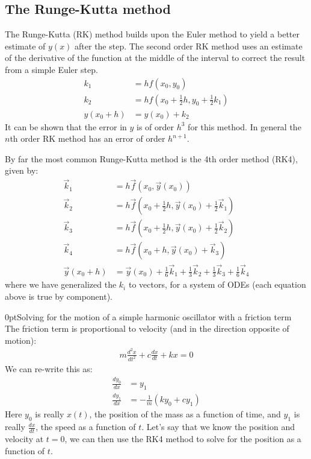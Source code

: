 \subsection{The Runge-Kutta method}

The Runge-Kutta (RK) method builds upon the Euler method to yield a better estimate of $y(x)$ after the step. The second order RK method uses an estimate of the derivative of the function at the middle of the interval to correct the result from a simple Euler step.
\begin{align}
 k_1 &= hf(x_0,y_0) \nonumber\\
 k_2 &= hf(x_0+\frac{1}{2}h,y_0+\frac{1}{2}k_1) \nonumber\\
 y(x_0+h) &= y(x_0)+k_2 
\end{align}
It can be shown that the error in $y$ is of order $h^3$ for this method. In general the $n$th order RK method has an error of order $h^{n+1}$.

By far the most common Runge-Kutta method is the 4th order method (RK4), given by:
\begin{align}
 \vec{k}_1 &= h\vec{f}(x_0,\vec{y}(x_0)) \nonumber\\
 \vec{k}_2 &= h\vec{f}(x_0+\frac{1}{2}h,\vec{y}(x_0)+\frac{1}{2}\vec{k}_1)\nonumber\\ 
 \vec{k}_3 &= h\vec{f}(x_0+\frac{1}{2}h,\vec{y}(x_0)+\frac{1}{2}\vec{k}_2) \nonumber\\
 \vec{k}_4 &= h\vec{f}(x_0+h,\vec{y}(x_0)+\vec{k}_3) \nonumber\\
 \vec{y}(x_0+h) &= \vec{y}(x_0)+\frac{1}{6}\vec{k}_1 +\frac{1}{3}\vec{k}_2 +\frac{1}{3}\vec{k}_3 +\frac{1}{6} \vec{k}_4 
\end{align}
where we have generalized the $k_i$ to vectors, for a system of ODEs (each equation above is true by component).
\begin{example}{0pt}{Solving for the motion of a simple harmonic oscillator with a friction term}{}
 The friction term is proportional to velocity (and in the direction opposite of motion):
\begin{align*}
 m\frac{d^2x}{dt^2}+c\frac{dx}{dt}+kx = 0
\end{align*}
We can re-write this as:
\begin{align*}
 \frac{dy_0}{dx} &= y_1 \nonumber\\
 \frac{dy_1}{dx} &= -\frac{1}{m}(ky_0+cy_1) 
\end{align*}
Here $y_0$ is really $x(t)$, the position of the mass as a function of time, and $y_1$ is really $\frac{dx}{dt}$, the speed as a function of $t$. Let's say that we know the position and velocity at $t=0$, we can then use the RK4 method to solve for the position as a function of $t$. 
\end{example}

